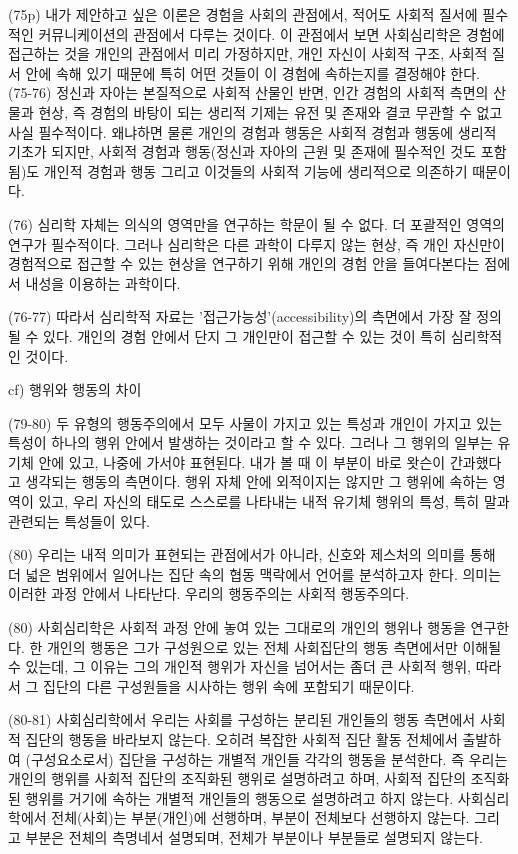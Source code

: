\documentclass[12pt, a4paper]{article}
\begin{document}
(75p) 내가 제안하고 싶은 이론은 경험을 사회의 관점에서, 적어도 사회적 질서에 필수적인 커뮤니케이션의 관점에서 다루는 것이다. 이 관점에서 보면 사회심리학은 경험에 접근하는 것을 개인의 관점에서 미리 가정하지만, 개인 자신이 사회적 구조, 사회적 질서 안에 속해 있기 때문에 특히 어떤 것들이 이 경험에 속하는지를 결정해야 한다. \\

(75-76) 정신과 자아는 본질적으로 사회적 산물인 반면, 인간 경험의 사회적 측면의 산물과 현상, 즉 경험의 바탕이 되는 생리적 기제는 유전 및 존재와 결코 무관할 수 없고 사실 필수적이다. 왜냐하면 물론 개인의 경험과 행동은 사회적 경험과 행동에 생리적 기초가 되지만, 사회적 경험과 행동(정신과 자아의 근원 및 존재에 필수적인 것도 포함됨)도 개인적 경험과 행동 그리고 이것들의 사회적 기능에 생리적으로 의존하기 때문이다. 

(76) 심리학 자체는 의식의 영역만을 연구하는 학문이 될 수 없다. 더 포괄적인 영역의 연구가 필수적이다. 그러나 심리학은 다른 과학이 다루지 않는 현상, 즉 개인 자신만이 경험적으로 접근할 수 있는 현상을 연구하기 위해 개인의 경험 안을 들여다본다는 점에서 내성을 이용하는 과학이다.

(76-77) 따라서 심리학적 자료는 '접근가능성'(accessibility)의 측면에서 가장 잘 정의될 수 있다. 개인의 경험 안에서 단지 그 개인만이 접근할 수 있는 것이 특히 심리학적인 것이다.

cf) 행위와 행동의 차이

(79-80) 두 유형의 행동주의에서 모두 사물이 가지고 있는 특성과 개인이 가지고 있는 특성이 하나의 행위 안에서 발생하는 것이라고 할 수 있다. 그러나 그 행위의 일부는 유기체 안에 있고, 나중에 가서야 표현된다. 내가 볼 때 이 부분이 바로 왓슨이 간과했다고 생각되는 행동의 측면이다. 행위 자체 안에 외적이지는 않지만 그 행위에 속하는 영역이 있고, 우리 자신의 태도로 스스로를 나타내는 내적 유기체 행위의 특성, 특히 말과 관련되는 특성들이 있다.

(80) 우리는 내적 의미가 표현되는 관점에서가 아니라, 신호와 제스처의 의미를 통해 더 넓은 범위에서 일어나는 집단 속의 협동 맥락에서 언어를 분석하고자 한다. 의미는 이러한 과정 안에서 나타난다. 우리의 행동주의는 사회적 행동주의다.

(80) 사회심리학은 사회적 과정 안에 놓여 있는 그대로의 개인의 행위나 행동을 연구한다. 한 개인의 행동은 그가 구성원으로 있는 전체 사회집단의 행동 측면에서만 이해될 수 있는데, 그 이유는 그의 개인적 행위가 자신을 넘어서는 좀더 큰 사회적 행위, 따라서 그 집단의 다른 구성원들을 시사하는 행위 속에 포함되기 때문이다.

(80-81) 사회심리학에서 우리는 사회를 구성하는 분리된 개인들의 행동 측면에서 사회적 집단의 행동을 바라보지 않는다. 오히려 복잡한 사회적 집단 활동 전체에서 출발하여 (구성요소로서) 집단을 구성하는 개별적 개인들 각각의 행동을 분석한다. 즉 우리는 개인의 행위를 사회적 집단의 조직화된 행위로 설명하려고 하며, 사회적 집단의 조직화된 행위를 거기에 속하는 개별적 개인들의 행동으로 설명하려고 하지 않는다. 사회심리학에서 전체(사회)는 부분(개인)에 선행하며, 부분이 전체보다 선행하지 않는다. 그리고 부분은 전체의 측명네서 설명되며, 전체가 부분이나 부분들로 설명되지 않는다. 
\end{document}
